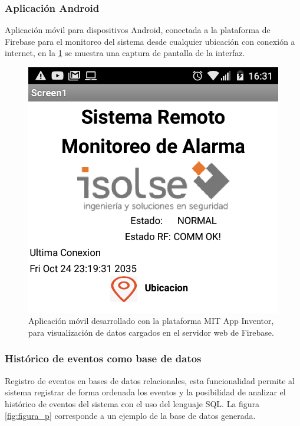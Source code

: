 \subsubsection{Aplicación Android}
Aplicación móvil para dispositivos Android, conectada a la plataforma de Firebase para el monitoreo del sistema desde cualquier ubicación con conexión a internet, en la \ref{fig:figura_n} se muestra una captura de pantalla de la interfaz.

\begin{figure}[ht]
	\centering
	\includegraphics[scale=.35]{./Figures/Capitulo4/Figura_N.png}
	\caption{Aplicación móvil desarrollado con la plataforma MIT App Inventor, para visualización de datos cargados en el servidor web de Firebase.}
	\label{fig:figura_n}
\end{figure}

\subsubsection{Histórico de eventos como base de datos}
Registro de eventos en bases de datos relacionales, esta funcionalidad permite al sistema registrar de forma ordenada los eventos y la posibilidad de analizar el histórico de eventos del sistema con el uso del lenguaje SQL. La figura \ref{fig:figura_p} corresponde a un ejemplo de la base de datos generada.


